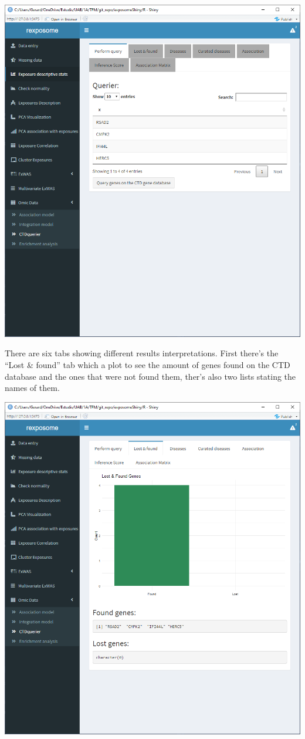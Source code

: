 \documentclass[
]{book}
\begin{document}
\includegraphics{images/analysis10_3.png}

There are six tabs showing different results interpretations. First there's the ``Lost \& found'' tab which a plot to see the amount of genes found on the CTD database and the ones that were not found them, ther's also two lists stating the names of them.

\includegraphics{images/analysis10_4.png}
\end{document}
